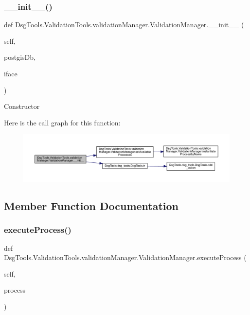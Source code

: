 \subsubsection{\texorpdfstring{\+\_\+\+\_\+init\+\_\+\+\_\+()}{\_\_init\_\_()}}
{\footnotesize\ttfamily def Dsg\+Tools.\+Validation\+Tools.\+validation\+Manager.\+Validation\+Manager.\+\_\+\+\_\+init\+\_\+\+\_\+ (\begin{DoxyParamCaption}\item[{}]{self,  }\item[{}]{postgis\+Db,  }\item[{}]{iface }\end{DoxyParamCaption})}

\begin{DoxyVerb}Constructor
\end{DoxyVerb}
 Here is the call graph for this function\+:
\nopagebreak
\begin{figure}[H]
\begin{center}
\leavevmode
\includegraphics[width=350pt]{class_dsg_tools_1_1_validation_tools_1_1validation_manager_1_1_validation_manager_a243f2909a5d134f7ed62cc2d7e6dc73c_cgraph}
\end{center}
\end{figure}


\subsection{Member Function Documentation}
\mbox{\label{class_dsg_tools_1_1_validation_tools_1_1validation_manager_1_1_validation_manager_af0cb4ad437c9307e43d2fdf837ae6284}} 
\subsubsection{\texorpdfstring{execute\+Process()}{executeProcess()}}
{\footnotesize\ttfamily def Dsg\+Tools.\+Validation\+Tools.\+validation\+Manager.\+Validation\+Manager.\+execute\+Process (\begin{DoxyParamCaption}\item[{}]{self,  }\item[{}]{process }\end{DoxyParamCaption})}

